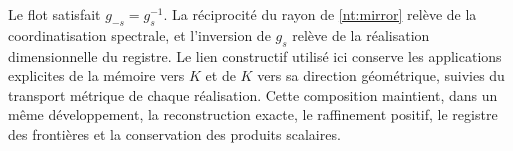Le flot satisfait \(g_{-s}=g_s^{-1}\). La réciprocité du rayon de \eqref{nt:mirror} relève de la coordinatisation spectrale, et l'inversion de \(g_s\) relève de la réalisation dimensionnelle du registre. Le lien constructif utilisé ici conserve les applications explicites de la mémoire vers \(K\) et de \(K\) vers sa direction géométrique, suivies du transport métrique de chaque réalisation. Cette composition maintient, dans un même développement, la reconstruction exacte, le raffinement positif, le registre des frontières et la conservation des produits scalaires.
